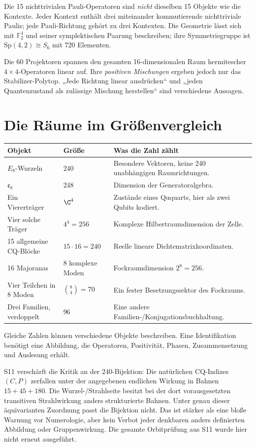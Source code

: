 Die 15 nichttrivialen Pauli-Operatoren sind \emph{nicht} dieselben 15 Objekte wie die Kontexte. Jeder Kontext enthält drei miteinander kommutierende nichttriviale Paulis; jede Pauli-Richtung gehört zu drei Kontexten. Die Geometrie lässt sich mit $\mathbb F_2^4$ und seiner symplektischen Paarung beschreiben; ihre Symmetriegruppe ist $\mathrm{Sp}(4,2)\cong S_6$ mit 720 Elementen.

Die 60 Projektoren spannen den gesamten 16-dimensionalen Raum hermitescher $4\times4$-Operatoren linear auf. Ihre \emph{positiven Mischungen} ergeben jedoch nur das Stabilizer-Polytop. „Jede Richtung linear ausdrücken“ und „jeden Quantenzustand als zulässige Mischung herstellen“ sind verschiedene Aussagen.

\section{Die Räume im Größenvergleich}
\begin{longtable}{L{45mm}L{31mm}L{74mm}}
\toprule
\textbf{Objekt}&\textbf{Größe}&\textbf{Was die Zahl zählt}\\\midrule\endhead
$E_8$-Wurzeln&240&Besondere Vektoren, keine 240 unabhängigen Raumrichtungen.\\
$\mathfrak e_8$&248&Dimension der Generatoralgebra.\\
Ein Viererträger&$\C^4$&Zustände eines Ququarts, hier als zwei Qubits kodiert.\\
Vier solche Träger&$4^4=256$&Komplexe Hilbertraumdimension der Zelle.\\
15 allgemeine CQ-Blöcke&$15\cdot16=240$&Reelle lineare Dichtematrixkoordinaten.\\
16 Majoranas&8 komplexe Moden&Fockraumdimension $2^8=256$.\\
Vier Teilchen in 8 Moden&$\binom84=70$&Ein fester Besetzungssektor des Fockraums.\\
Drei Familien, verdoppelt&96&Eine andere Familien-/Konjugationsbuchhaltung.\\\bottomrule
\end{longtable}
Gleiche Zahlen können verschiedene Objekte beschreiben. Eine Identifikation benötigt eine Abbildung, die Operatoren, Positivität, Phasen, Zusammensetzung und Auslesung erhält.

S11 verschärft die Kritik an der 240-Bijektion: Die natürlichen CQ-Indizes $(C,P)$ zerfallen unter der angegebenen endlichen Wirkung in Bahnen $15+45+180$. Die Wurzel-/Strahlseite besitzt bei der dort vorausgesetzten transitiven Strahlwirkung anders strukturierte Bahnen. Unter genau dieser äquivarianten Zuordnung passt die Bijektion nicht. Das ist stärker als eine bloße Warnung vor Numerologie, aber kein Verbot jeder denkbaren anders definierten Abbildung oder Gruppenwirkung. Die gesamte Orbitprüfung aus S11 wurde hier nicht erneut ausgeführt.

